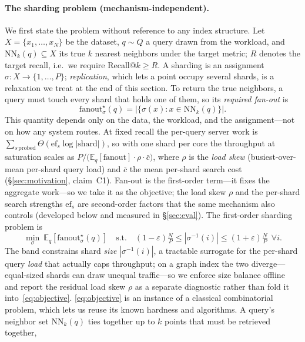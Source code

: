 \paragraph{The sharding problem (mechanism-independent).}
We first state the problem without reference to any index structure. Let
$X=\{x_1,\dots,x_N\}$ be the dataset, $q\sim Q$ a query drawn from the workload,
and $\mathrm{NN}_k(q)\subseteq X$ its true $k$ nearest neighbors under the target
metric; $R$ denotes the target recall, i.e.\ we require Recall@$k\ge R$. A
sharding is an assignment $\sigma:X\to\{1,\dots,P\}$; \emph{replication}, which
lets a point occupy several shards, is a relaxation we treat at the end of this
section. To return the true neighbors, a
query must touch every shard that holds one of them, so its \emph{required
fan-out} is
\[
\mathrm{fanout}^\star_\sigma(q)=\bigl|\{\sigma(x):x\in\mathrm{NN}_k(q)\}\bigr|.
\]
This quantity depends only on the data, the workload, and the assignment---not on
how any system routes. At fixed recall the per-query server work is
$\sum_{s\,\text{probed}}\Theta(\mathrm{ef}_s\log|\text{shard}|)$, so with one shard
per core the throughput at saturation scales as
$P/\bigl(\mathbb{E}_q[\mathrm{fanout}]\cdot\rho\cdot\bar c\bigr)$, where $\rho$ is
the \emph{load skew} (busiest-over-mean per-shard query load) and $\bar c$ the
mean per-shard search cost (\S\ref{sec:motivation}, claim~C1). Fan-out is the
first-order term---it fixes the aggregate work---so we take it as the objective;
the load skew $\rho$ and the per-shard search strengths $\mathrm{ef}_s$ are
second-order factors that the same mechanism also controls (developed below and
measured in \S\ref{sec:eval}). The first-order sharding problem is
\begin{equation}
\label{eq:objective}
\min_{\sigma}\ \mathbb{E}_{q}\!\left[\mathrm{fanout}^\star_\sigma(q)\right]
\quad\text{s.t.}\quad
(1-\varepsilon)\tfrac{N}{P}\le |\sigma^{-1}(i)| \le (1+\varepsilon)\tfrac{N}{P}\ \ \forall i .
\end{equation}
The band constrains shard \emph{size} $|\sigma^{-1}(i)|$, a tractable surrogate
for the per-shard query \emph{load} that actually caps throughput; on a graph
index the two diverge---equal-sized shards can draw unequal traffic---so we
enforce size balance offline and report the residual load skew $\rho$ as a
separate diagnostic rather than fold it into~\eqref{eq:objective}.
\eqref{eq:objective} is an instance of a classical combinatorial problem, which
lets us reuse its known hardness and algorithms. A query's neighbor set
$\mathrm{NN}_k(q)$ ties together up to $k$ points that must be retrieved together,
